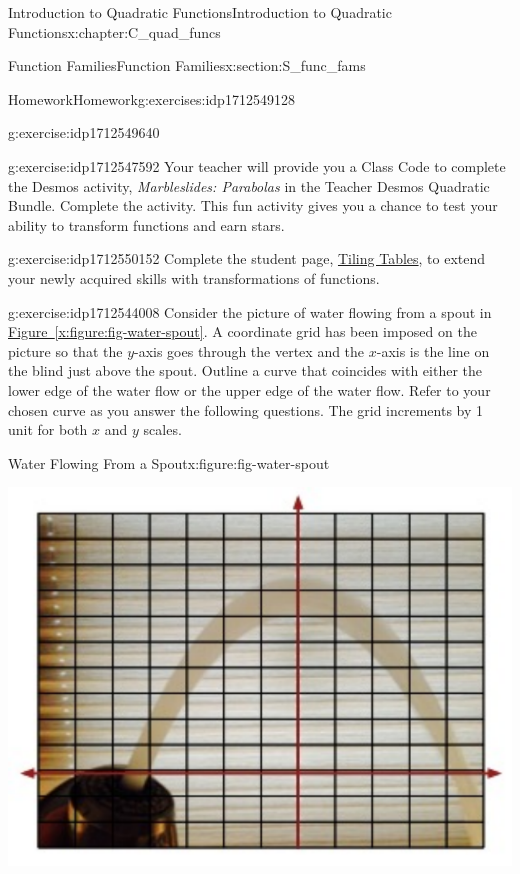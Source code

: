 \documentclass[oneside,10pt,]{book}
\newcommand{\xreffont}{\relax}
\newcommand{\pubtitle}[1]{\textsl{#1}}
\numberwithin{equation}{chapter}
\begin{document}
\begin{chapterptx}{Introduction to Quadratic Functions}{}{Introduction to Quadratic Functions}{}{}{x:chapter:C_quad_funcs}
\begin{sectionptx}{Function Families}{}{Function Families}{}{}{x:section:S_func_fams}
\begin{exercises-subsection}{Homework}{}{Homework}{}{}{g:exercises:idp1712549128}
\begin{divisionexercise}{1}{}{}{g:exercise:idp1712549640}
\end{divisionexercise}%
\begin{divisionexercise}{2}{}{}{g:exercise:idp1712547592}%
Your teacher will provide you a Class Code to complete the Desmos activity, \pubtitle{Marbleslides: Parabolas} in the Teacher Desmos Quadratic Bundle. Complete the activity. This fun activity gives you a chance to test your ability to transform functions and earn stars.%
\end{divisionexercise}%
\begin{divisionexercise}{3}{}{}{g:exercise:idp1712550152}%
Complete the student page, \hyperref[x:worksheet:act-tile-tables]{Tiling Tables}, to extend your newly acquired skills with transformations of functions.%
\end{divisionexercise}%
\begin{divisionexercise}{4}{}{}{g:exercise:idp1712544008}%
Consider the picture of water flowing from a spout in \hyperref[x:figure:fig-water-spout]{Figure~{\xreffont\ref{x:figure:fig-water-spout}}}. A coordinate grid has been imposed on the picture so that the \(y\)-axis goes through the vertex and the \(x\)-axis is the line on the blind just above the spout. Outline a curve that coincides with either the lower edge of the water flow or the upper edge of the water flow. Refer to your chosen curve as you answer the following questions. The grid increments by 1 unit for both \(x\) and \(y\) scales.%
\begin{figureptx}{Water Flowing From a Spout}{x:figure:fig-water-spout}{}%
\begin{image}{0.2}{0.6}{0.2}%
\includegraphics[width=\linewidth]{external/water-spout.pdf}

\end{image}
\end{figureptx}
\end{divisionexercise}
\end{exercises-subsection}
\end{sectionptx}
\end{chapterptx}
\end{document}
